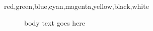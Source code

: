 \documentclass{article}
\begin{document}
\begin{description}
  \item[red,green,blue,cyan,magenta,yellow,black,white] body
        text goes here
\end{description}
\caption[short,list,entry,that,is,long,enough,to,overflow,the,width]{Full}
\end{document}
